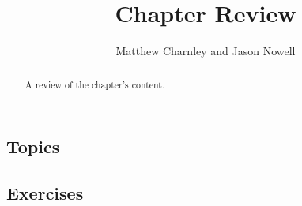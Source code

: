 \documentclass{ximera}
\title{Chapter Review}
\author{Matthew Charnley and Jason Nowell}
\begin{document}
\begin{abstract}
    A review of the chapter's content.
\end{abstract}
\maketitle




\subsection{Topics}

\subsection{Exercises}
\end{document}
